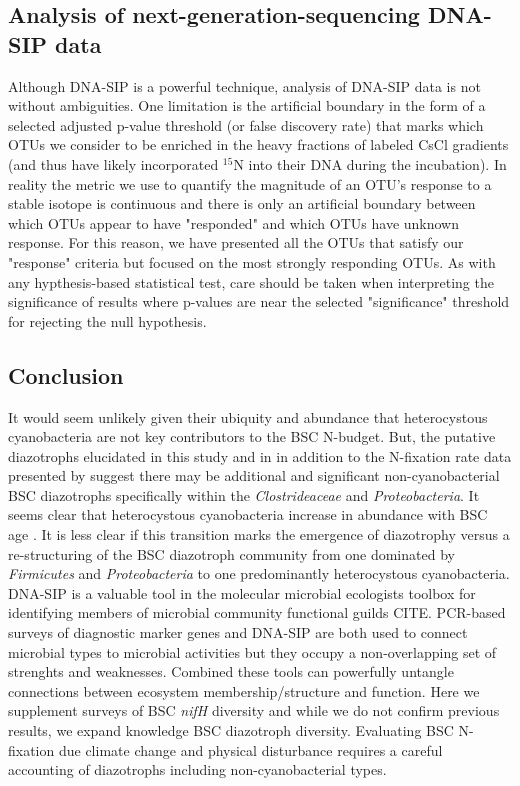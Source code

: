 \subsection{Analysis of next-generation-sequencing DNA-SIP data}
Although DNA-SIP is a powerful technique, analysis of DNA-SIP data is not
without ambiguities. One limitation is the artificial boundary in the form of a
selected adjusted p-value threshold (or false discovery rate) that marks which
OTUs we consider to be enriched in the heavy fractions of labeled CsCl
gradients (and thus have likely incorporated $^{15}$N into their DNA during the
incubation). In reality the metric we use to quantify the magnitude of an OTU's
response to a stable isotope is continuous and there is only an artificial
boundary between which OTUs appear to have "responded" and which OTUs have
unknown response. For this reason, we have presented all the OTUs that satisfy
our "response" criteria but focused on the most strongly responding OTUs. As
with any hypthesis-based statistical test, care should be taken when
interpreting the significance of results where p-values are near the selected
"significance" threshold for rejecting the null hypothesis.

\subsection{Conclusion}
It would seem unlikely given their ubiquity and abundance that heterocystous
cyanobacteria are not key contributors to the BSC N-budget. But, the putative
diazotrophs elucidated in this study and in \citet{Steppe_1996} in addition to
the N-fixation rate data presented by \citep{15643930} suggest there may be
additional and significant non-cyanobacterial BSC diazotrophs specifically
within the \textit{Clostrideaceae} and \textit{Proteobacteria}. It seems clear
that heterocystous cyanobacteria increase in abundance with BSC age
\citep{14766579}. It is less clear if this transition marks the emergence of
diazotrophy versus a re-structuring of the BSC diazotroph community from one
dominated by \textit{Firmicutes} and \textit{Proteobacteria} to one
predominantly heterocystous cyanobacteria. DNA-SIP is a valuable tool in the
molecular microbial ecologists toolbox for identifying members of microbial
community functional guilds CITE. PCR-based surveys of diagnostic marker genes
and DNA-SIP are both used to connect microbial types to microbial activities
but they occupy a non-overlapping set of strenghts and weaknesses. Combined
these tools can powerfully untangle connections between ecosystem
membership/structure and function. Here we supplement surveys of BSC
\textit{nifH} diversity and while we do not confirm previous results, we expand
knowledge BSC diazotroph diversity. Evaluating BSC N-fixation due climate
change and physical disturbance requires a careful accounting of diazotrophs
including non-cyanobacterial types. 
